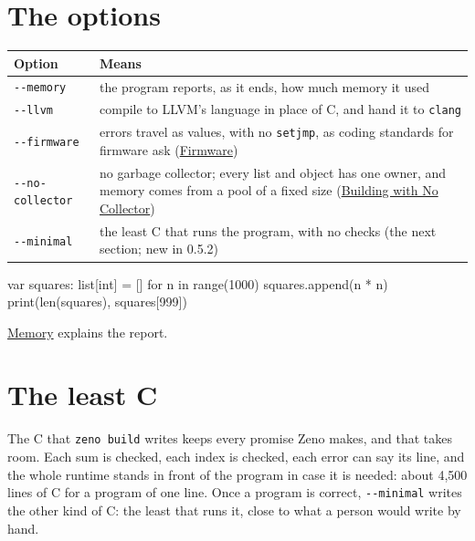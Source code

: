 \section{The options}

\begin{center}
\begin{tabular}{lP{8.5cm}}
\toprule
Option & Means \\
\midrule
\verb|--memory| & the program reports, as it ends, how much memory it used \\
\verb|--llvm| & compile to LLVM's language in place of C, and hand it to \verb|clang| \\
\verb|--firmware| & errors travel as values, with no \verb|setjmp|, as coding
  standards for firmware ask (\hyperref[ch-firmware]{Firmware}) \\
\verb|--no-collector| & no garbage collector; every list and object has
  one owner, and memory comes from a pool of a fixed size
  (\hyperref[ch-no-collector]{Building with No Collector}) \\
\verb|--minimal| & the least C that runs the program, with no checks
  (the next section; new in 0.5.2) \\
\bottomrule
\end{tabular}
\end{center}

\begin{zeno}[file=lists.zeno, cmd=zeno build --memory {file} ;; ./lists]
var squares: list[int] = []
for n in range(1000) {
    squares.append(n * n)
}
print(len(squares), squares[999])
\end{zeno}

\hyperref[ch-memory]{Memory} explains the report.

\section{The least C}

The C that \verb|zeno build| writes keeps every promise Zeno makes,
and that takes room. Each sum is checked, each index is checked, each
error can say its line, and the whole runtime stands in front of the
program in case it is needed: about 4,500 lines of C for a program of
one line. Once a program is correct, \verb|--minimal| writes the
other kind of C: the least that runs it, close to what a person would
write by hand.


